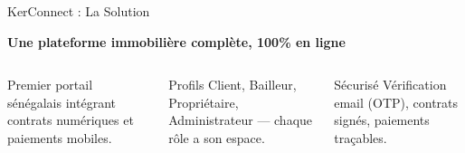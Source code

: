 ﻿\documentclass[aspectratio=169,10pt]{beamer}
\newcommand{\kcblue}[1]{\textcolor{kcIndigo}{\textbf{#1}}}
\begin{document}
\begin{frame}{KerConnect : La Solution}
\begin{center}\large\kcblue{Une plateforme immobili\`{e}re compl\`{e}te, 100\% en ligne}\end{center}
\vspace{0.3cm}
\begin{columns}[T]
\begin{block}{}
\centering Premier portail s\'{e}n\'{e}galais int\'{e}grant contrats num\'{e}riques et paiements mobiles.
\end{block}
\begin{block}{ Profils}
\centering Client, Bailleur, Propri\'{e}taire, Administrateur --- chaque r\^{o}le a son espace.
\end{block}
\begin{block}{\centering S\'{e}curis\'{e}}
\centering V\'{e}rification email (OTP), contrats sign\'{e}s, paiements tra\c{c}ables.
\end{block}
\end{columns}
\vspace{0.4cm}
\begin{center}
\end{center}
\end{frame}
\end{document}
